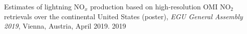 \begin{cvpublications}
\publication
{Estimates of lightning NO$_x$ production based on high-resolution OMI NO$_2$ retrievals over the continental United States (poster),
\emph{EGU General Assembly 2019},
Vienna, Austria, April 2019.} %
{2019} %

\end{cvpublications}
